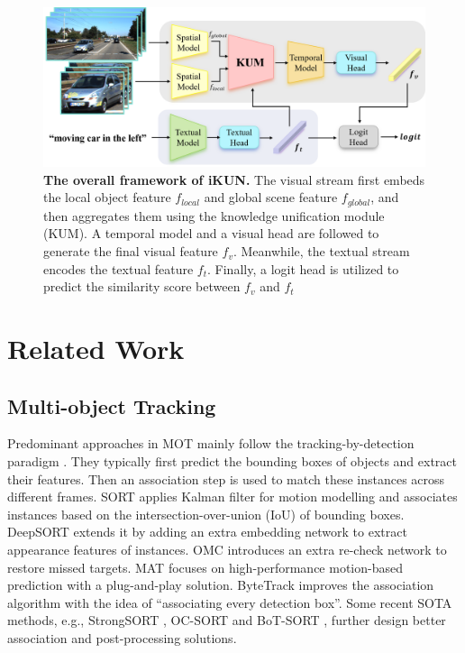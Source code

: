 \documentclass[10pt,twocolumn,letterpaper]{article}
\begin{document}
\begin{figure}
    \centering
    \includegraphics[width=.75\textwidth]{iKUN.png}
    \caption{
        \textbf{The overall framework of iKUN.}
        The visual stream first embeds the local object feature $f_{local}$ and global scene feature $f_{global}$,
        and then aggregates them using the knowledge unification module (KUM).
        A temporal model and a visual head are followed to generate the final visual feature $f_v$.
        Meanwhile, the textual stream encodes the textual feature $f_t$.
        Finally, a logit head is utilized to predict the similarity score between $f_v$ and $f_t$
    }
    \label{fig_3}
\end{figure}

\section{Related Work}
\subsection{Multi-object Tracking}
    Predominant approaches in MOT mainly follow the tracking-by-detection paradigm 
    \cite{yu2016poi, bochinski2017high, wang2020towards, zhang2021fairmot, yang2023hard}.
    They typically first predict the bounding boxes of objects and extract their features.
    Then an association step is used to match these instances across different frames.
    SORT \cite{bewley2016simple} applies Kalman filter for motion modelling and associates instances based on the intersection-over-union (IoU) of bounding boxes.
    DeepSORT \cite{wojke2017simple} extends it by adding an extra embedding network to extract appearance features of instances.
    OMC \cite{liang2022one} introduces an extra re-check network to restore missed targets.
    MAT \cite{han2022mat} focuses on high-performance motion-based prediction with a plug-and-play solution.
    ByteTrack \cite{zhang2022bytetrack} improves the association algorithm with the idea of ``associating every detection box''.
    Some recent SOTA methods, e.g., StrongSORT \cite{du2023strongsort}, OC-SORT \cite{cao2023observation} and BoT-SORT \cite{aharon2022bot},
    further design better association and post-processing solutions.
    
\end{document}
